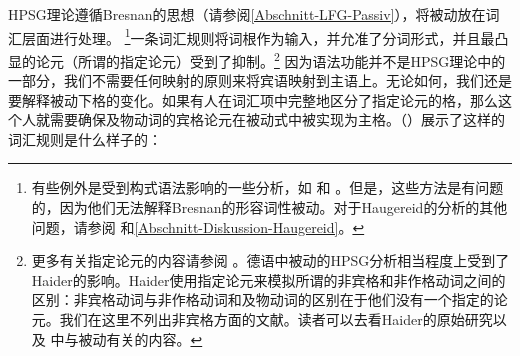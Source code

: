 HPSG理论遵循Bresnan的思想（请参阅\ref{Abschnitt-LFG-Passiv}），将被动放在词汇层面进行处理。
\footnote{%
有些例外是受到构式语法影响的一些分析，如 \citet{Tseng2007a}和 \citet{Haugereid2007a}。但是，这些方法是有问题的，因为他们无法解释Bresnan的形容词性被动。对于Haugereid的分析的其他问题，请参阅 和\ref{Abschnitt-Diskussion-Haugereid}。
}一条词汇规则将词根作为输入，并允准了分词形式，并且最凸显的论元（所谓的指定论元）受到了抑制。\footnote{%
更多有关指定论元的内容请参阅 。德语中被动的HPSG分析相当程度上受到了Haider的影响。Haider使用指定论元来模拟所谓的非宾格和非作格动词之间的区别\citep{Perlmutter78}：非宾格动词与非作格动词和及物动词的区别在于他们没有一个指定的论元。我们在这里不列出非宾格方面的文献。读者可以去看Haider的原始研究以及 中与被动有关的内容。
}
因为语法功能并不是HPSG理论中的一部分，我们不需要任何映射的原则来将宾语映射到主语上。无论如何，我们还是要解释被动下格的变化。如果有人在词汇项中完整地区分了指定论元的格，那么这个人就需要确保及物动词的宾格论元在被动式中被实现为主格。（）展示了这样的词汇规则是什么样子的：

